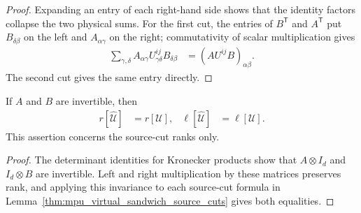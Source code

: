 \begin{proof}\leanok
    Expanding an entry of each right-hand side shows that the identity factors collapse the
    two physical sums. For the first cut, the entries of $B^{\mathsf T}$ and
    $A^{\mathsf T}$ put $B_{\delta\beta}$ on the left and
    $A_{\alpha\gamma}$ on the right; commutativity of scalar multiplication
    gives
    \begin{align}
        \sum_{\gamma,\delta}
        A_{\alpha\gamma}U^{ij}_{\gamma\delta}B_{\delta\beta}
         & =(A U^{ij}B)_{\alpha\beta}.
    \end{align}
    The second cut gives the same entry directly.
\end{proof}

\begin{lemma}
    \label{thm:mpu_virtual_sandwich_source_ranks}
    \leanok
    If $A$ and $B$ are invertible, then
    \begin{align}
        r[\widehat{\mathcal U}]    & =r[\mathcal U],    &
        \ell[\widehat{\mathcal U}] & =\ell[\mathcal U].
    \end{align}
    This assertion concerns the source-cut ranks only.
\end{lemma}

\begin{proof}\leanok
    The determinant identities for Kronecker products show that
    $A\otimes I_d$ and $I_d\otimes B$ are invertible. Left and right
    multiplication by these matrices preserves rank, and applying this invariance to
    each source-cut formula in
    Lemma~\ref{thm:mpu_virtual_sandwich_source_cuts} gives both equalities.
\end{proof}

